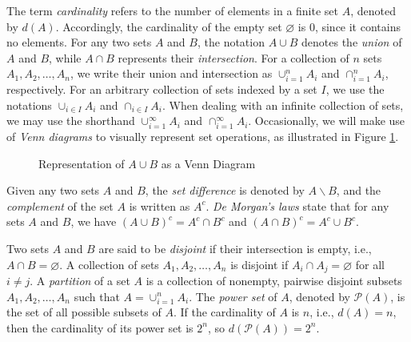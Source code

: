 The term \emph{cardinality} refers to the number of elements in a finite set $A$, denoted by $d(A)$. Accordingly, the cardinality of the empty set $\varnothing$ is 0, since it contains no elements. For any two sets $A$ and $B$, the notation $A \cup B$ denotes the \emph{union} of $A$ and $B$, while $A \cap B$ represents their \emph{intersection}. For a collection of $n$ sets $A_1, A_2, \ldots, A_n$, we write their union and intersection as $\cup_{i=1}^n A_i$ and $\cap_{i=1}^n A_i$, respectively. For an arbitrary collection of sets indexed by a set $I$, we use the notations $\cup_{i \in I} A_i$ and $\cap_{i \in I} A_i$. When dealing with an infinite collection of sets, we may use the shorthand $\cup_{i=1}^{\infty} A_i$ and $\cap_{i=1}^{\infty} A_i$. Occasionally, we will make use of \emph{Venn diagrams} to visually represent set operations, as illustrated in Figure \ref{fig:Venn-diagram}.

\begin{figure}[t]
\centering
{}
\caption{\label{fig:Venn-diagram}Representation of $A \cup B$ as a Venn Diagram}
\end{figure}

Given any two sets $A$ and $B$, the \emph{set difference} is denoted by $A \backslash B$, and the \emph{complement} of the set $A$ is written as $A^c$. \emph{De Morgan's laws} state that for any sets $A$ and $B$, we have $\left( A \cup B \right)^c = A^c \cap B^c$ and $\left( A \cap B \right)^c = A^c \cup B^c$.

Two sets $A$ and $B$ are said to be \emph{disjoint} if their intersection is empty, i.e., $A \cap B = \varnothing$. A collection of sets $A_1, A_2, \ldots, A_n$ is disjoint if $A_i \cap A_j = \varnothing$ for all $i \neq j$. A \emph{partition} of a set $A$ is a collection of nonempty, pairwise disjoint subsets $A_1, A_2, \ldots, A_n$ such that $A = \cup_{i=1}^n A_i$. The \emph{power set} of $A$, denoted by $\mathcal{P}(A)$, is the set of all possible subsets of $A$. If the cardinality of $A$ is $n$, i.e., $d(A) = n$, then the cardinality of its power set is $2^n$, so $d\left( \mathcal{P}(A) \right) = 2^n$.

